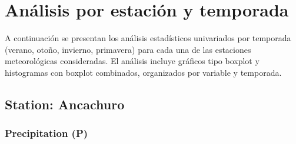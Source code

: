 \chapter{Análisis por estación y temporada}

A continuación se presentan los análisis estadísticos univariados por temporada (verano, otoño, invierno, primavera) para cada una de las estaciones meteorológicas consideradas. El análisis incluye gráficos tipo boxplot y histogramas con boxplot combinados, organizados por variable y temporada.

\section{Station: Ancachuro}

\subsection{Precipitation (P)}

